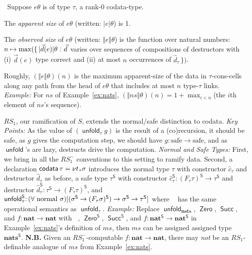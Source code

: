 \documentclass[envcountsame]{llncs}
\newcommand{\co}[1]{\hat{#1}}
\newcommand{\safe}[1]{#1^{\mathsf{S}}}
\newcommand{\key}[1]{\ensuremath{\mathop{\mathsf{#1}}\nolimits}\xspace}
\newcommand{\unfold}{\key{unfold}}
\newcommand{\unfolds}[1]{\mathop{\safe{\mathsf{unfold}}_{#1}}}
\newcommand{\ms}{\mathit{ms}}
\newcommand{\ns}{\mathit{ns}}
\newcommand{\type}[1]{\ensuremath{\mathbf{#1}}\xspace}
\newcommand{\Nat}{\type{nat}}
\newcommand{\Nats}{\type{nats}}
\newcommand{\constr}[1]{\ensuremath{\mathop{\mathsf{#1}}\nolimits}\xspace}
\newcommand{\Zero}{\constr{Zero}}
\newcommand{\Succ}{\constr{Succ}}
\newcommand{\codata}{\constr{codata}}
\newcommand{\asize}[1]{\ensuremath{\mathopen{|}#1\mathclose{|}}\xspace}
\newcommand{\osize}[1]{\ensuremath{\mathopen{\Vert}#1\mathclose{\Vert}}}
\newcommand{\gfp}[1]{\nu #1\,\sqdot\,}
\newcommand{\RSi}{\mathit{RS_1}}
\newcommand{\RSmi}{\mathit{RS^-_1}}
\newcommand{\Topic}[1]{\smallskip\noindent{\textbf{#1{.}}}\enspace}
\newcommand{\suchthat}{\mathrel{\,\stackrel{\rule{0.03em}{0.5ex}}{\rule[-.1ex]{0.03em}{0.5ex}}\,}}
\newcommand{\sqdot}{\rule{0.5mm}{0.5mm}}
\newcommand{\of}{\colon}
\renewcommand{\colon}{\mathpunct{:}}
\begin{document}
\begin{definition}  \label{d:ob:size} \
Suppose $e\theta$ is of type $\tau$, a rank-0 codata-type.
  
  \begin{asparaenum}[(a)]
  \item 
The \emph{apparent size} of $e\theta$ (written:
    $\asize{e}\theta$) is 1.


  \item 
The \emph{observed size} of $e\theta$ (written:
    $\osize{e}\theta$) is the function over natural numbers:
    $n\mapsto\max(\{\, \asize{\vec{d}(e)}\theta \suchthat \vec{d}$
    varies over sequences of compositions of destructors with (i)
    $\vec{d}(e)$ type correct and (ii) at most $n$ occurrences of
    $\co{d}_\tau\,\})$.



  \end{asparaenum}
\end{definition}

Roughly, $(\osize{e}\theta)(n)$ is the maximum apparent-size of the
data in $\tau$-cons-cells along any path from the head of $e\theta$
that includes at most $n$ type-$\tau$ links.  \emph{Example:} For
$\ns$ of Example~\ref{ex:nats},
$(\osize{\ns}\theta)(n)=1+\max_{i<n}$(the $i$th element of $\ns$'s
sequence).



\Topic{The Ramified Case}
$\RSi$, our ramification of $S$, extends the normal/safe distinction
to codata.  \emph{Key Points:} As the value of
$(\unfold_\tau g)$ is the result of a (co)recursion, it should be
safe,  as $g$ gives the computation step, we should have
$g\of\mathrm{safe}\to\mathrm{safe}$, and as $\unfold$'s are lazy, 
destructs drive the computation.
 \emph{Normal and Safe
  Types:} First, we bring in all the
$\RSmi$ conventions to this setting to ramify data.
Second, a declaration
$\codata\tau=\gfp{t}\sigma$ introduces the normal type $\tau$ with
constructor $\co{c}_\tau$ and destructor $\co{d}_\tau$ as before, a
safe type $\safe\tau$ with constructor $\safe{\hat{c}}_{\tau}\of
\safe{(F_\tau \tau)}\to\safe\tau$ and destructor
$\safe{\co{d}}_{\tau}\of \safe\tau\to\safe{(F_\tau \tau)}$, and
$\unfolds{\tau}\of(\forall \hbox{ normal }\sigma)[ (\safe\sigma\to
\safe{(F_\tau\sigma)})\to\safe\sigma \to \safe\tau]$ where $\unfolds{\tau}$ has
the same operational semantics as $\unfold_\tau$.  \emph{Example:}
Replace $\unfold_\Nats$, $\Zero$,  $\Succ$, and $f\of\Nat\to\Nat$
with $\unfolds{\Nats}$, $\safe\Zero$,  $\safe\Succ$, and
$f\of\safe\Nat\to\safe\Nat$ in
Example~\ref{ex:nats}'s definition of $\ms$, then $\ms$ can be
assigned assigned type $\safe\Nats$.  
\textbf{N.B.}
Given an $\RSmi$-computable $f\of\Nat\to\Nat$, there may 
\emph{not} be an $\RSi$-definable analogue of $\ms$ from
Example~\ref{ex:nats}.
\end{document}
